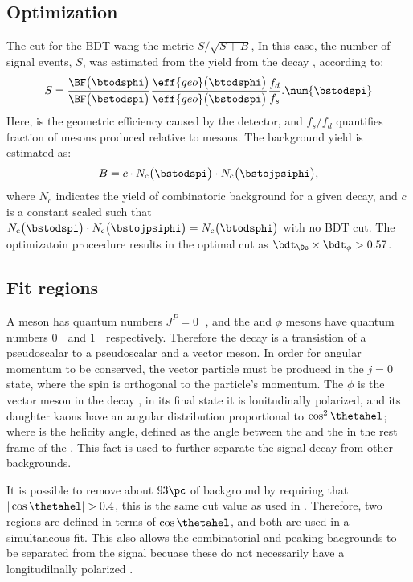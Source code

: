 \subsection{Optimization}
The cut for the BDT wang the metric $S/\sqrt{S+B}$,
In this case, the number of signal events, $S$, was estimated from the yield from the decay
\decay{\Bs}{\Dsm\pip}, according to:
\begin{equation}
  S = \frac{ \BF\big(\btodsphi\big) }{ \BF\big(\bstodspi\big) }
  \frac{ \eff{geo}\big(\btodsphi\big) }{ \eff{geo}\big(\bstodspi\big) }
  \frac{f_d}{f_s}.
  \num{\bstodspi}
\end{equation}
Here,  is the geometric efficiency caused by the detector, and $f_s/f_d$ quantifies
fraction of \Bs mesons produced relative to \Bd mesons.
The background yield is estimated as:
\begin{equation}
  B = c\cdot N_\mathrm{c}\big(\bstodspi\big)\cdot N_\mathrm{c}\big(\bstojpsiphi\big),
\end{equation}
where $N_\mathrm{c}$ indicates the yield of combinatoric background for a given decay, and
$c$ is a constant scaled such that
$N_\mathrm{c}\big(\bstodspi\big)\cdot
N_\mathrm{c}\big(\bstojpsiphi\big)=N_\mathrm{c}\big(\btodsphi\big)$ with no BDT cut.
The optimizatoin proceedure results in the optimal cut as $\bdt_{\Ds}\times\bdt_\phi>0.57$.



\subsection{Fit regions}
\label{sec:dsphi:hel}
A \Bp meson has quantum numbers $J^P=0^-$, and the \Ds and $\phi$ mesons have
quantum numbers $0^-$ and $1^-$ respectively.
Therefore the decay \btodsphi is a transistion of a pseudoscalar to a pseudoscalar and a vector
meson.
In order for angular momentum to be conserved, the vector particle must be produced in the $j=0$
state, where the spin is orthogonal to the particle's momentum.
The $\phi$ is the vector meson in the decay \btodsphi, in its final state it is lonitudinally
polarized, and its daughter kaons have an angular distribution proportional to $\cos^2\thetahel$;
where \thetahel is the helicity angle, defined as the angle between the \Kp and the \Bp in the rest frame of the \Ds.
This fact is used to further separate the signal decay \btodsphi from other backgrounds.


It is possible to remove about $93\pc$ of background by requiring that $|\cos\thetahel|>0.4$,
this is the same cut value as used in .
Therefore, two regions are defined in terms of $\cos\thetahel$, and both are used in a simultaneous
fit.
This also allows the combinatorial and peaking bacgrounds to be separated from the signal becuase
these do not necessarily have a longitudilnally polarized \phii.

